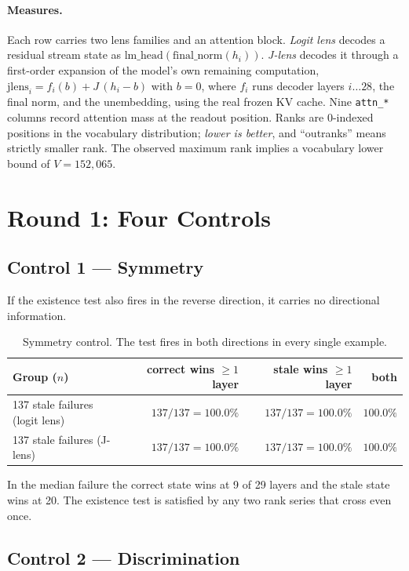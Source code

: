 \documentclass[11pt]{article}
\newcommand{\code}[1]{\texttt{\small #1}}
\newcommand{\fail}[1]{\textcolor{bad}{\textbf{#1}}}
\begin{document}
\paragraph{Measures.} Each row carries two lens families and an attention block.
\emph{Logit lens} decodes a residual stream state as
$\mathrm{lm\_head}(\mathrm{final\_norm}(h_i))$. \emph{J-lens} decodes it through a
first-order expansion of the model's own remaining computation,
$\mathrm{jlens}_i = f_i(b) + J\,(h_i - b)$ with $b=0$, where $f_i$ runs decoder layers
$i \ldots 28$, the final norm, and the unembedding, using the real frozen KV cache. Nine
\code{attn\_*} columns record attention mass at the readout position. Ranks are
0-indexed positions in the vocabulary distribution; \emph{lower is better}, and
``outranks'' means strictly smaller rank. The observed maximum rank implies a vocabulary
lower bound of $V = 152{,}065$.

\section{Round 1: Four Controls}
\label{sec:round1}

\subsection{Control 1 --- Symmetry}

If the existence test also fires in the reverse direction, it carries no directional
information.

\begin{table}[h]
\centering\small
\begin{tabular}{lrrr}
\toprule
Group ($n$) & correct wins $\geq 1$ layer & stale wins $\geq 1$ layer & both \\
\midrule
137 stale failures (logit lens) & $137/137 = 100.0\%$ & \fail{$137/137 = 100.0\%$} & $100.0\%$ \\
137 stale failures (J-lens)     & $137/137 = 100.0\%$ & \fail{$137/137 = 100.0\%$} & $100.0\%$ \\
\bottomrule
\end{tabular}
\caption{Symmetry control. The test fires in both directions in every single example.}
\end{table}

In the median failure the correct state wins at 9 of 29 layers and the stale state wins at
20. The existence test is satisfied by any two rank series that cross even once.

\subsection{Control 2 --- Discrimination}
\end{document}
